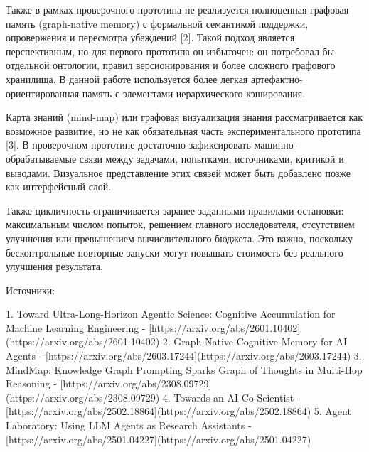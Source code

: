 Также в рамках проверочного прототипа не реализуется полноценная графовая память (graph-native memory) с формальной семантикой поддержки, опровержения и пересмотра убеждений [2]. Такой подход является перспективным, но для первого прототипа он избыточен: он потребовал бы отдельной онтологии, правил версионирования и более сложного графового хранилища. В данной работе используется более легкая артефактно-ориентированная память с элементами иерархического кэширования.

Карта знаний (mind-map) или графовая визуализация знания рассматривается как возможное развитие, но не как обязательная часть экспериментального прототипа [3]. В проверочном прототипе достаточно зафиксировать машинно-обрабатываемые связи между задачами, попытками, источниками, критикой и выводами. Визуальное представление этих связей может быть добавлено позже как интерфейсный слой.

Также цикличность ограничивается заранее заданными правилами остановки: максимальным числом попыток, решением главного исследователя, отсутствием улучшения или превышением вычислительного бюджета. Это важно, поскольку бесконтрольные повторные запуски могут повышать стоимость без реального улучшения результата.

Источники:

1. Toward Ultra-Long-Horizon Agentic Science: Cognitive Accumulation for Machine Learning Engineering - [https://arxiv.org/abs/2601.10402](https://arxiv.org/abs/2601.10402)
2. Graph-Native Cognitive Memory for AI Agents - [https://arxiv.org/abs/2603.17244](https://arxiv.org/abs/2603.17244)
3. MindMap: Knowledge Graph Prompting Sparks Graph of Thoughts in Multi-Hop Reasoning - [https://arxiv.org/abs/2308.09729](https://arxiv.org/abs/2308.09729)
4. Towards an AI Co-Scientist - [https://arxiv.org/abs/2502.18864](https://arxiv.org/abs/2502.18864)
5. Agent Laboratory: Using LLM Agents as Research Assistants - [https://arxiv.org/abs/2501.04227](https://arxiv.org/abs/2501.04227)
